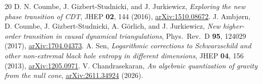 \documentclass[11pt]{article}
\theoremstyle{remark}
\numberwithin{equation}{section}
\begin{document}
\begin{thebibliography}{20}
 D. N. Coumbe, J. Gizbert-Studnicki, and J. Jurkiewicz, \emph{Exploring the new phase transition of CDT}, JHEP \textbf{02}, 144 (2016), \href{https://arxiv.org/abs/1510.08672}{arXiv:1510.08672}.
 J. Ambj{\o}rn, D. Coumbe, J. Gizbert-Studnicki, A. G{\"o}rlich, and J. Jurkiewicz, \emph{New higher-order transition in causal dynamical triangulations}, Phys.\ Rev.\ D \textbf{95}, 124029 (2017), \href{https://arxiv.org/abs/1704.04373}{arXiv:1704.04373}.
 A. Sen, \emph{Logarithmic corrections to Schwarzschild and other non-extremal black hole entropy in different dimensions}, JHEP \textbf{04}, 156 (2013), \href{https://arxiv.org/abs/1205.0971}{arXiv:1205.0971}.
 V. Chandrasekaran, \emph{An algebraic quantization of gravity from the null cone}, \href{https://arxiv.org/abs/2611.34924}{arXiv:2611.34924} (2026).
\end{thebibliography}
\endgroup
\end{document}
